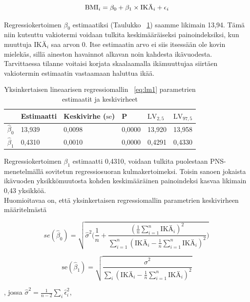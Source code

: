 \documentclass[finnish]{docopts}
\begin{document}
\begin{equation}
\text{BMI}_i = \beta_0 + \beta_1 \times \text{IKÄ}_i + \epsilon_i \label{eq:lm1}\\
\end{equation}


Regressiokertoimen $\beta_0$ estimaatiksi (Taulukko ~\ref{table:lm1}) saamme likimain 13,94. Tämä niin kutsuttu vakiotermi voidaan tulkita keskimääräiseksi painoindeksiksi, kun muuttuja $\text{IKÄ}_i$ saa arvon 0. Itse estimaatin arvo ei siis itsessään ole kovin mielekäs, sillä aineston havainnot alkavan noin kahdesta ikävuodesta. Tarvittaessa tilanne voitaisi korjata skaalaamalla ikämuuttujaa siirtäen vakiotermin estimaatin vastaamaan haluttua ikää.\\

\begin{table}[H]
\centering
\begin{tabular}{llllll}
\toprule
  & Estimaatti & Keskivirhe ($\text{se}$) & P & $\text{LV}_{2,5}$ & $\text{LV}_{97,5}$\\
\midrule
$\hat{\beta}_0$ & 13,939 & 0,0098 & 0,0000 & 13,920 & 13,958\\
$\hat{\beta}_1$ & 0,4310 & 0,0010 & 0,0000 & 0,4291 & 0,4330\\
\bottomrule
\end{tabular}
\caption{Yksinkertaisen lineaarisen regressiomallin ~\ref{eq:lm1} parametrien estimaatit ja keskivirheet}
\label{table:lm1}
\end{table}

Regressiokertoimen $\beta_1$ estimaatti 0,4310, voidaan tulkita puolestaan PNS-menetelmällä sovitetun regressiosuoran kulmakertoimeksi. Toisin sanoen jokaista ikävuoden yksikkömuutosta kohden keskimääräinen painoindeksi kasvaa likimain 0,43 yksikköä.\\

Huomioitavaa on, että yksinkertaisen regressiomallin parametrien keskivirheen määritelmästä

$$
se(\hat{\beta}_0)= \sqrt{\hat{\sigma}^2 \Bigg( \frac{1}{n}+\frac{( \frac{1}{n}\sum\limits_{i = 1}^{n}\text{IKÄ}_i)^2}{\sum_{i=1}^n (\text{IKÄ}_i- \frac{1}{n}\sum\limits_{i = 1}^{n}\text{IKÄ}_i)^2} \Bigg)}\,\!
$$

$$
\text{se}(\hat{\beta}_1) = \sqrt{\frac{\hat{\sigma}^2}{\sum_i (\text{IKÄ}_i - \frac{1}{n}\sum\limits_{i = 1}^{n}\text{IKÄ}_i)^2}}
$$

, jossa $\hat{\sigma}^2 = \frac{1}{n-2} \sum_i \hat{\epsilon}_i^2$,\\
\end{document}
